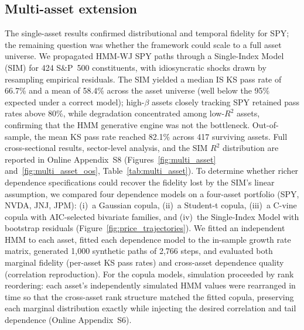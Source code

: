 \subsection{Multi-asset extension}
The single-asset results confirmed distributional and temporal fidelity for SPY; the remaining question was whether the framework could scale to a full asset universe. We propagated HMM-WJ SPY paths through a Single-Index Model (SIM) for 424 S\&P~500 constituents, with idiosyncratic shocks drawn by resampling empirical residuals. The SIM yielded a median IS KS pass rate of 66.7\% and a mean of 58.4\% across the asset universe (well below the 95\% expected under a correct model); high-$\beta$ assets closely tracking SPY retained pass rates above 80\%, while degradation concentrated among low-$R^2$ assets, confirming that the HMM generative engine was not the bottleneck. Out-of-sample, the mean KS pass rate reached 82.1\% across 417 surviving assets. Full cross-sectional results, sector-level analysis, and the SIM $R^2$ distribution are reported in Online Appendix~S8 (Figures~\ref{fig:multi_asset} and~\ref{fig:multi_asset_oos}, Table~\ref{tab:multi_asset}). To determine whether richer dependence specifications could recover the fidelity lost by the SIM's linear assumption, we compared four dependence models on a four-asset portfolio (SPY, NVDA, JNJ, JPM): (i)~a Gaussian copula, (ii)~a Student-t copula, (iii)~a C-vine copula with AIC-selected bivariate families, and (iv)~the Single-Index Model with bootstrap residuals (Figure~\ref{fig:price_trajectories}). We fitted an independent HMM to each asset, fitted each dependence model to the in-sample growth rate matrix, generated 1,000 synthetic paths of 2,766 steps, and evaluated both marginal fidelity (per-asset KS pass rates) and cross-asset dependence quality (correlation reproduction). For the copula models, simulation proceeded by rank reordering: each asset's independently simulated HMM values were rearranged in time so that the cross-asset rank structure matched the fitted copula, preserving each marginal distribution exactly while injecting the desired correlation and tail dependence (Online Appendix~S6).



